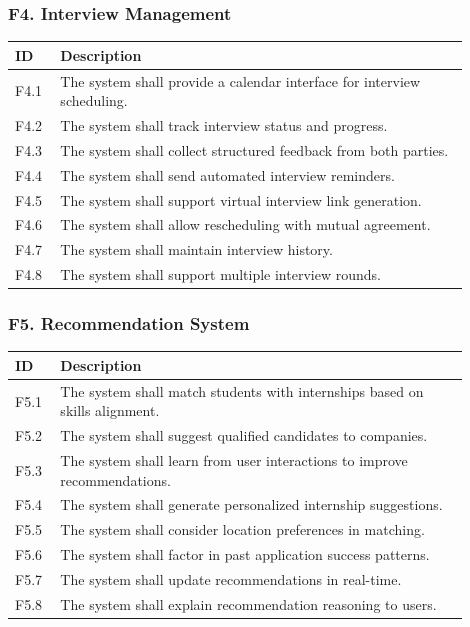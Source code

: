 \subsubsection{F4. Interview Management}
\begin{center}
    \begin{longtable}{ |l|p{0.9\linewidth}| }
        \hline
        \textbf{ID} & \textbf{Description} \\
        \hline
        F4.1 & The system shall provide a calendar interface for interview scheduling. \\
        \hline
        F4.2 & The system shall track interview status and progress. \\
        \hline
        F4.3 & The system shall collect structured feedback from both parties. \\
        \hline
        F4.4 & The system shall send automated interview reminders. \\
        \hline
        F4.5 & The system shall support virtual interview link generation. \\
        \hline
        F4.6 & The system shall allow rescheduling with mutual agreement. \\
        \hline
        F4.7 & The system shall maintain interview history. \\
        \hline
        F4.8 & The system shall support multiple interview rounds. \\
        \hline
    \end{longtable}
\end{center}

\subsubsection{F5. Recommendation System}
\begin{center}
    \begin{longtable}{ |l|p{0.9\linewidth}| }
        \hline
        \textbf{ID} & \textbf{Description} \\
        \hline
        F5.1 & The system shall match students with internships based on skills alignment. \\
        \hline
        F5.2 & The system shall suggest qualified candidates to companies. \\
        \hline
        F5.3 & The system shall learn from user interactions to improve recommendations. \\
        \hline
        F5.4 & The system shall generate personalized internship suggestions. \\
        \hline
        F5.5 & The system shall consider location preferences in matching. \\
        \hline
        F5.6 & The system shall factor in past application success patterns. \\
        \hline
        F5.7 & The system shall update recommendations in real-time. \\
        \hline
        F5.8 & The system shall explain recommendation reasoning to users. \\
        \hline
    \end{longtable}
\end{center}

